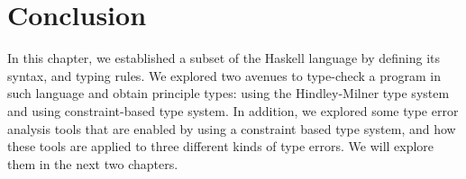 \section{Conclusion}
In this chapter, we established a subset of the Haskell language by defining its syntax, and typing rules. We explored two avenues to type-check a program in such language and obtain principle types: using the Hindley-Milner type system and using constraint-based type system. In addition, we explored some type error analysis tools that are enabled by using a constraint based type system, and how these tools are applied to three different kinds of type errors. We will explore them in the next two chapters.
